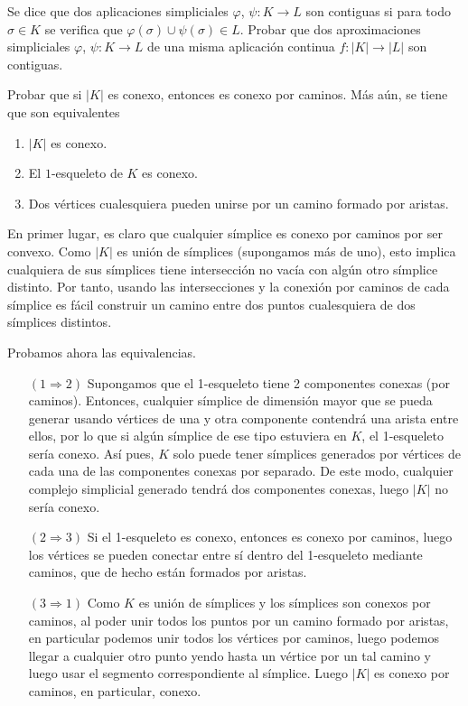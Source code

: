 \documentclass[twoside]{article}
\begin{document}
\newpage

\begin{ejercicio}{1.4}
Se dice que dos aplicaciones simpliciales $φ$, $ψ : K \to L$ son contiguas si para todo $σ \in K$ se verifica que $φ(σ) \cup ψ(σ) \in L$.
Probar que dos aproximaciones simpliciales $φ$, $ψ : K \to L$ de una misma aplicación continua $f : |K| \to |L|$ son contiguas.
\end{ejercicio}
\begin{solucion}
\end{solucion}

\newpage

\begin{ejercicio}{1.5}
Probar que si $|K|$ es conexo, entonces es conexo por caminos.
Más aún, se tiene que son equivalentes
\begin{enumerate}
\item $|K|$ es conexo.
\item El $1$-esqueleto de $K$ es conexo.
\item Dos vértices cualesquiera pueden unirse por un camino formado por aristas.
\end{enumerate}
\end{ejercicio}
\begin{solucion}
En primer lugar, es claro que cualquier símplice es conexo por caminos por ser convexo. Como $|K|$ es unión de símplices (supongamos más de uno), esto implica cualquiera de sus símplices tiene intersección no vacía con algún otro símplice distinto. Por tanto, usando las intersecciones y la conexión por caminos de cada símplice es fácil construir un camino entre dos puntos cualesquiera de dos símplices distintos.

Probamos ahora las equivalencias.
\begin{enumerate}
\item[$(1\Rightarrow 2)$] Supongamos que el 1-esqueleto tiene 2 componentes conexas (por caminos). Entonces, cualquier símplice de dimensión mayor que se pueda generar usando vértices de una y otra componente contendrá una arista entre ellos, por lo que si algún símplice de ese tipo estuviera en $K$, el 1-esqueleto sería conexo. Así pues, $K$ solo puede tener símplices generados por vértices de cada una de las componentes conexas por separado. De este modo, cualquier complejo simplicial  generado tendrá dos componentes conexas, luego $|K|$ no sería conexo.
\item[$(2\Rightarrow 3)$] Si el 1-esqueleto es conexo, entonces es conexo por caminos, luego los vértices se pueden conectar entre sí dentro del 1-esqueleto mediante caminos, que de hecho están formados por aristas.
\item[$(3\Rightarrow 1)$] Como $K$ es unión de símplices y los símplices son conexos por caminos, al poder unir todos los puntos por un camino formado por aristas, en particular podemos unir todos los vértices por caminos, luego podemos llegar a cualquier otro punto yendo hasta un vértice por un tal camino y luego usar el segmento correspondiente al símplice. Luego $|K|$ es conexo por caminos, en particular, conexo.
\end{enumerate}

\end{solucion}
\end{document}
